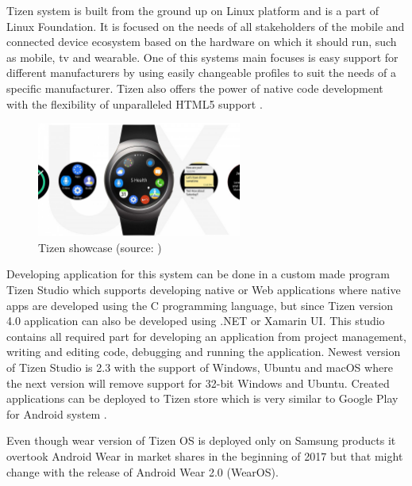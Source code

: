 Tizen system is built from the ground up on Linux platform and is a part of Linux Foundation. It is focused on the needs of all stakeholders of the mobile and connected device ecosystem based on the hardware on which it should run, such as mobile, tv and wearable. One of this systems main focuses is easy support for different manufacturers by using easily changeable profiles to suit the needs of a specific manufacturer. Tizen also offers the power of native code development with the flexibility of unparalleled HTML5 support \cite{TizenAbout}.

\begin{figure}[H]
	\begin{centering}
		\includegraphics[width=0.6\textwidth]{img/tizen}
		\par\end{centering}
	\caption{Tizen showcase (source: \cite{NFFAWSW})\label{fig:Tizen}}
	\label{fig05c04}
\end{figure}

Developing application for this system can be done in a custom made program Tizen Studio which supports developing native or Web applications where native apps are developed using the C programming language, but since Tizen version 4.0 application can also be developed using .NET or Xamarin UI. This studio contains all required part for developing an application from project management, writing and editing code, debugging and running the application. Newest version of Tizen Studio is 2.3 with the support of Windows, Ubuntu and macOS where the next version will remove support for 32-bit Windows and Ubuntu. Created applications can be deployed to Tizen store which is very similar to Google Play for Android system \cite{TizenDev}.

Even though wear version of Tizen OS is deployed only on Samsung products it overtook Android Wear in market shares in the beginning of 2017 but that might change with the release of Android Wear 2.0 (WearOS). 

